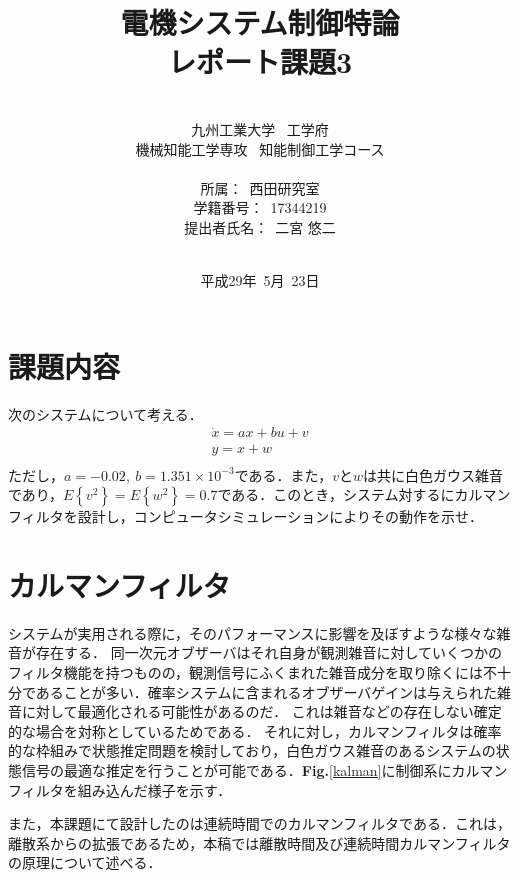 \documentclass[a4paper,12pt]{jarticle}
\title{\Large{電機システム制御特論\\ レポート課題3}
}
\author{\vspace{70mm}\\
九州工業大学\ \hspace{0mm} 工学府\\
機械知能工学専攻\ \hspace{0mm} 知能制御工学コース\\
\\
所属：\ 西田研究室\\
学籍番号：\ 17344219\\
提出者氏名：\ 二宮 \hspace{0mm} 悠二\\\vspace{5mm}\\}
\date{平成29年\ 5月\ 23日}
\begin{document}
\titlepage
\maketitle
\thispagestyle{empty}
\newpage

\thispagestyle{empty}
\tableofcontents
\newpage

\section{課題内容}
%
次のシステムについて考える．
%
\begin{equation*}
 \begin{array}{c}
  \dot{x} = ax + bu + v \\
  y = x + w \\
 \end{array}
\end{equation*}
%
ただし，$ a = -0.02 , ~ b = 1.351 \times 10^{-3} $である．また，$ v $と$ w $は共に白色ガウス雑音であり，$ E \left\{v^2 \right\} = E \left\{w^2 \right\} = 0.7 $である．このとき，システム対するにカルマンフィルタを設計し，コンピュータシミュレーションによりその動作を示せ．


\section{カルマンフィルタ}
%
システムが実用される際に，そのパフォーマンスに影響を及ぼすような様々な雑音が存在する．
同一次元オブザーバはそれ自身が観測雑音に対していくつかのフィルタ機能を持つものの，観測信号にふくまれた雑音成分を取り除くには不十分であることが多い．確率システムに含まれるオブザーバゲインは与えられた雑音に対して最適化される可能性があるのだ．
これは雑音などの存在しない確定的な場合を対称としているためである．
それに対し，カルマンフィルタは確率的な枠組みで状態推定問題を検討しており，白色ガウス雑音のあるシステムの状態信号の最適な推定を行うことが可能である．{\bf Fig.}\ref{kalman}に制御系にカルマンフィルタを組み込んだ様子を示す．

また，本課題にて設計したのは連続時間でのカルマンフィルタである．これは，離散系からの拡張であるため，本稿では離散時間及び連続時間カルマンフィルタの原理について述べる．
\end{document}
